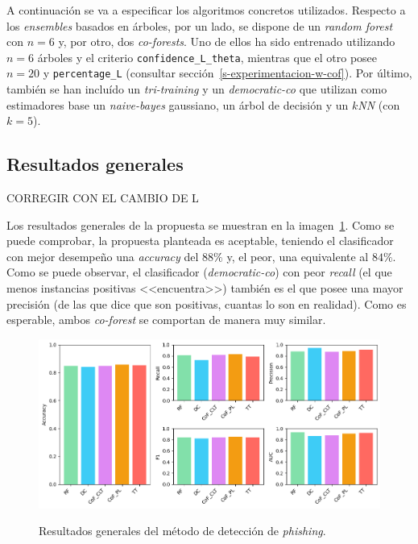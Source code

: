 A continuación se va a especificar los algoritmos concretos utilizados. Respecto a los \textit{ensembles} basados en árboles, por un lado, se dispone de un \textit{random forest} con $n = 6$ y, por otro, dos \textit{co-forests}. Uno de ellos ha sido entrenado utilizando $n = 6$ árboles y el criterio \texttt{confidence\_L\_theta}, mientras que el otro posee $n = 20$ y \texttt{percentage\_L} (consultar sección~\ref{s-experimentacion-w-cof}). Por último, también se han incluído un \textit{tri-training} y un \textit{democratic-co} que utilizan como estimadores base un \textit{naive-bayes} gaussiano, un árbol de decisión y un \textit{$k$NN} (con $k = 5$).


\subsection{Resultados generales}

CORREGIR CON EL CAMBIO DE L

Los resultados generales de la propuesta se muestran en la imagen~\ref{gr:ph-f1f19-all}. Como se puede comprobar, la propuesta planteada es aceptable, teniendo el clasificador con mejor desempeño una \textit{accuracy} del $88\%$ y, el peor, una equivalente al $84\%$. Como se puede observar, el clasificador (\textit{democratic-co}) con peor \textit{recall} (el que menos instancias positivas <<encuentra>>) también es el que posee una mayor precisión (de las que dice que son positivas, cuantas lo son en realidad). Como es esperable, ambos \textit{co-forest} se comportan de manera muy similar.

\begin{figure}[h]
	\caption[\textit{Phishing}: detección (\texttt{f1-f19})]{Resultados generales del método de detección de \textit{phishing}.}
	\centering
	\includegraphics[width=\textwidth]{../img/memoria/5_phishing/f1f19_all_big}
	\label{gr:ph-f1f19-all}
\end{figure}

